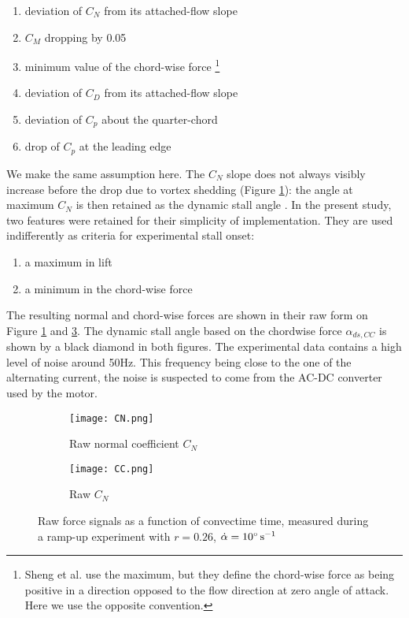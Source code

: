 \begin{enumerate}
	\item deviation of $C_N$ from its attached-flow slope
	\item $C_M$ dropping by 0.05 
	\item minimum value of the chord-wise force \footnote{Sheng et al. use the maximum, but they define the chord-wise force as being positive in a direction opposed to the flow direction at zero angle of attack. Here we use the opposite convention.}
	\item deviation of $C_D$ from its attached-flow slope
	\item deviation of $C_p$ about the quarter-chord
	\item drop of $C_p$ at the leading edge
\end{enumerate}

We make the same assumption here. The $C_N$ slope does not always visibly increase before the drop due to vortex shedding (Figure \ref{fig:CN_ramp_example}): the angle at maximum $C_N$ is then retained as the dynamic stall angle \cite{mulleners_dynamic_2013}. In the present study, two features were retained for their simplicity of implementation. They are used indifferently as criteria for experimental stall onset:

\begin{enumerate}
	\item a maximum in lift
	\item a minimum in the chord-wise force
\end{enumerate} 

The resulting normal and chord-wise forces are shown in their raw form on Figure \ref{fig:CN_ramp_example} and \ref{fig:CC_ramp_example}. The dynamic stall angle based on the chordwise force $\alpha_{ds,CC}$ is shown by a black diamond in both figures. The experimental data contains a high level of noise around 50Hz. This frequency being close to the one of the alternating current, the noise is suspected to come from the AC-DC converter used by the motor. 

\begin{figure}[h]
	\begin{subfigure}{.5\textwidth}
		\texttt{[image: CN.png]}
		\caption{Raw normal coefficient $C_N$}
		\label{fig:CN_ramp_example}
	\end{subfigure}%
	\begin{subfigure}{.5\textwidth}
		\texttt{[image: CC.png]}
		\caption{Raw $C_N$}
		\label{fig:CC_ramp_example}
	\end{subfigure}
	\caption{Raw force signals as a function of convectime time, measured during a ramp-up experiment with $r=0.26$, $\dot{\alpha} = 10 \si{\degree \per \second}$}
\end{figure}

